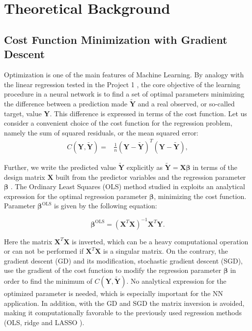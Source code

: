 \documentclass{emulateapj}
\begin{document}
\section{Theoretical Background}
\label{sec: Theoretical background}

\subsection{Cost Function Minimization with Gradient Descent}
\label{subsec: Cost function minimization with gradient descent}
Optimization is one of the main features of Machine Learning. By analogy with the linear regression tested in the Project 1 \cite{proj1,proj1_2},  the core objective of the learning procedure in a neural network is to find a set of optimal parameters minimizing the difference between a prediction made $\tilde{\textbf{Y}}$ and a real observed, or so-called target, value \textbf{Y}. This difference is expressed in terms of the cost function. Let us consider a convenient choice of the cost function for the regression problem, namely the sum of squared residuals, or the mean squared error:
\begin{equation}
\begin{split}
      C(\textbf{Y},\tilde{\textbf{Y}})=&\frac{1}{n}(\textbf{Y}-\tilde{\textbf{Y}})^T(\textbf{Y}-\tilde{\textbf{Y}}),
\end{split}
\end{equation}

Further, we write the predicted value  $\tilde{\textbf{Y}}$ explicitly as $\tilde{\textbf{Y}}=\textbf{X}\boldsymbol{\beta}$ in terms of the design matrix $\textbf{X}$ built from the predictor variables and the regression parameter $\boldsymbol{\beta}$ \cite{Morten}. The Ordinary Least Squares (OLS) method studied in \cite{proj1,proj1_2} exploits an analytical expression for the optimal regression parameter $\boldsymbol{\beta}$, minimizing the cost function.  Parameter $\boldsymbol{\beta}^{\mathrm{OLS}}$ is given by the following equation:

\begin{equation}
    \boldsymbol{\beta}^{\mathrm{OLS}} = (\mathbf{X}^T \mathbf{X})^{-1} \mathbf{X}^T \mathbf{Y}.
    \label{eq:beta-ols}
\end{equation}

Here the matrix $\mathbf{X}^T\mathbf{X}$ is inverted, which can be a heavy computational operation or can not be performed if $\mathbf{X}^T\mathbf{X}$ is a singular matrix. On the contrary, the gradient descent (GD) and its modification, stochastic gradient descent (SGD), use the gradient of the cost function to modify the regression parameter $\boldsymbol{\beta}$ in order to find the minimum of $C(\textbf{Y},\tilde{\textbf{Y}})$. No analytical expression for the optimized parameter is needed, which is especially important for the NN application. In addition, with the GD and SGD the matrix inversion is avoided, making it computationally favorable to the previously used regression methods (OLS, ridge and LASSO \cite{Morten}). 
\end{document}
